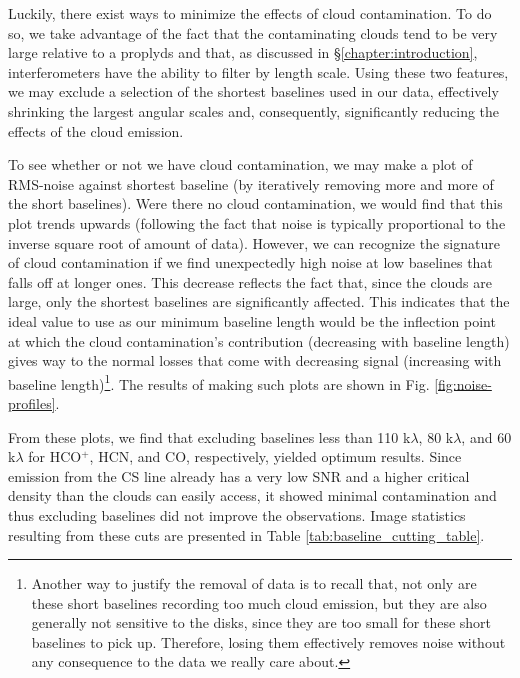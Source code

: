 Luckily, there exist ways to minimize the effects of cloud contamination. To do so, we take advantage of the fact that the contaminating clouds tend to be very large relative to a proplyds and that, as discussed in \S\ref{chapter:introduction}, interferometers have the ability to filter by length scale. Using these two features, we may exclude a selection of the shortest baselines used in our data, effectively shrinking the largest angular scales and, consequently, significantly reducing the effects of the cloud emission.


To see whether or not we have cloud contamination, we may make a plot of RMS-noise against shortest baseline (by iteratively removing more and more of the short baselines). Were there no cloud contamination, we would find that this plot trends upwards (following the fact that noise is typically proportional to the inverse square root of amount of data). However, we can recognize the signature of cloud contamination if we find unexpectedly high noise at low baselines that falls off at longer ones. This decrease reflects the fact that, since the clouds are large, only the shortest baselines are significantly affected. This indicates that the ideal value to use as our minimum baseline length would be the inflection point at which the cloud contamination's contribution (decreasing with baseline length) gives way to the normal losses that come with decreasing signal (increasing with baseline length)\footnote{Another way to justify the removal of data is to recall that, not only are these short baselines recording too much cloud emission, but they are also generally not sensitive to the disks, since they are too small for these short baselines to pick up. Therefore, losing them effectively removes noise without any consequence to the data we really care about.}. The results of making such plots are shown in Fig. \ref{fig:noise-profiles}.

From these plots, we find that excluding baselines less than 110 k$\lambda$, 80 k$\lambda$, and 60  k$\lambda$ for HCO$^{+}$, HCN, and CO, respectively, yielded optimum results. Since emission from the CS line already has a very low SNR and a higher critical density than the clouds can easily access, it showed minimal contamination and thus excluding baselines did not improve the observations. Image statistics resulting from these cuts are presented in Table \ref{tab:baseline_cutting_table}.


